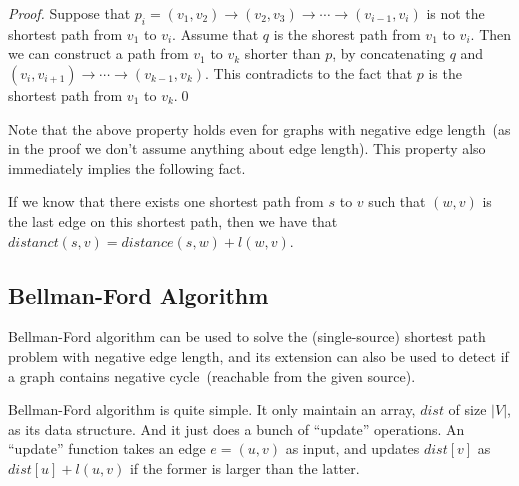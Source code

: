 \emph{Proof.} Suppose that 
$p_i = (v_1, v_2) \to (v_2, v_3) \to \cdots \to (v_{i-1}, v_i)$
is not the shortest path from $v_1$ to $v_i$. Assume that
$q$ is the shorest path from $v_1$ to $v_i$.
Then we can construct a path from $v_1$ to $v_k$ shorter than $p$,
by concatenating $q$ and $(v_i, v_{i+1}) \to \cdots \to (v_{k-1}, v_k)$.
This contradicts to the fact that $p$ is the shortest path from $v_1$ to $v_k$.\qed

Note that the above property holds even for graphs with negative edge length~(as
in the proof we don't assume anything about edge length).
This property also immediately implies the following fact.

\begin{property}
If we know that there exists one shortest path from $s$ to $v$ such that $(w,v)$ is the last edge
on this shortest path, then we have that $distanct(s,v) = distance(s,w) + l(w,v)$.
\end{property}


\subsection*{Bellman-Ford Algorithm}

Bellman-Ford algorithm can be used to solve the (single-source) shortest path problem with negative edge length,
and its extension can also be used to detect if a graph contains negative cycle~(reachable from the given source).

Bellman-Ford algorithm is quite simple. It only maintain an array, 
$dist$ of size $|V|$, as its data structure. And it just does a bunch of ``update'' operations.
An ``update'' function takes an edge $e = (u,v)$ as input, and updates $dist[v]$ as $dist[u] + l(u,v)$ if
the former is larger than the latter.  

\begin{minipage}{0.8\textwidth}
	\xxx
	\xxx
	\xxx
	\xxx
	\xxx
\end{minipage}




